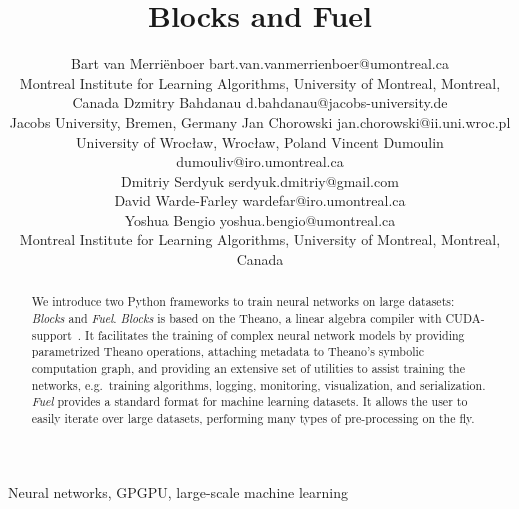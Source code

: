 \documentclass[twoside,11pt]{article}
\begin{document}
\title{Blocks and Fuel}

\author{\name Bart van Merri\"{e}nboer \email bart.van.vanmerrienboer@umontreal.ca \\
        \addr Montreal Institute for Learning Algorithms, University of Montreal, Montreal, Canada
        \AND
        \name Dzmitry Bahdanau \email d.bahdanau@jacobs-university.de \\
        \addr Jacobs University, Bremen, Germany
        \AND
        \name Jan Chorowski \email jan.chorowski@ii.uni.wroc.pl \\
        \addr University of Wroc\l aw, Wroc\l aw, Poland
        \AND
        \name Vincent Dumoulin \email dumouliv@iro.umontreal.ca \\
        \name Dmitriy Serdyuk \email serdyuk.dmitriy@gmail.com \\
        \name David Warde-Farley \email wardefar@iro.umontreal.ca \\
        \name Yoshua Bengio \email yoshua.bengio@umontreal.ca \\
        \addr Montreal Institute for Learning Algorithms, University of Montreal, Montreal, Canada}


\maketitle

\begin{abstract}%
  We introduce two Python frameworks to train neural networks on large
  datasets: \emph{Blocks} and \emph{Fuel}. \emph{Blocks} is based on the
  Theano, a linear algebra compiler with
  CUDA-support~\citep{Bastien-Theano-2012,bergstra+al:2010-scipy}. It
  facilitates the training of complex neural network models by providing
  parametrized Theano operations, attaching metadata to Theano's symbolic
  computation graph, and providing an extensive set of utilities to assist
  training the networks, e.g.\ training algorithms, logging, monitoring,
  visualization, and serialization. \emph{Fuel} provides a standard format for
  machine learning datasets. It allows the user to easily iterate over large
  datasets, performing many types of pre-processing on the fly.
\end{abstract}

\begin{keywords}
  Neural networks, GPGPU, large-scale machine learning
\end{keywords}
\end{document}
